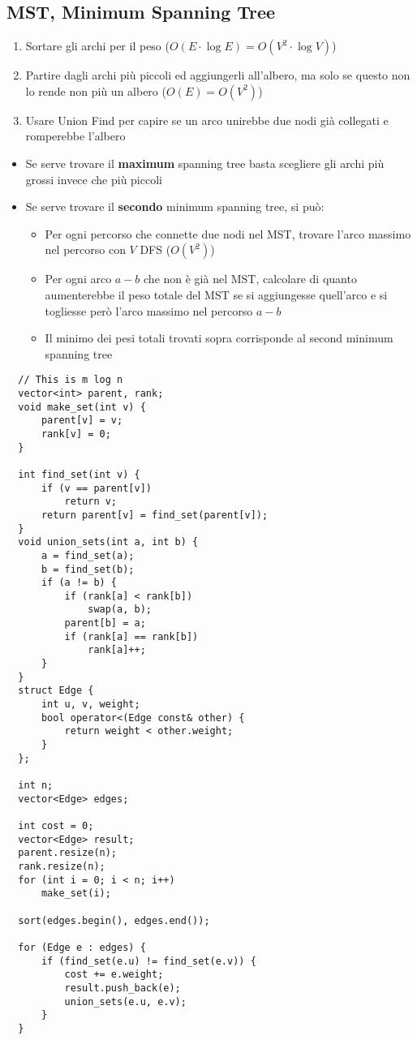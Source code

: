 \subsection{MST, Minimum Spanning Tree}
\begin{enumerate}
    \item Sortare gli archi per il peso ($O(E\cdot \log E)=O(V^2\cdot \log V)$)
    \item Partire dagli archi più piccoli ed aggiungerli all'albero, ma solo se questo non lo rende non più un albero ($O(E)=O(V^2)$)
    \item Usare Union Find per capire se un arco unirebbe due nodi già collegati e romperebbe l'albero
\end{enumerate}
\begin{itemize}
    \item Se serve trovare il \textbf{maximum} spanning tree basta scegliere gli archi più grossi invece che più piccoli
    \item Se serve trovare il \textbf{secondo} minimum spanning tree, si può:
    \begin{itemize}
        \item Per ogni percorso che connette due nodi nel MST, trovare l'arco massimo nel percorso con $V$ DFS ($O(V^2)$)
        \item Per ogni arco $a-b$ che non è già nel MST, calcolare di quanto aumenterebbe il peso totale del MST se si aggiungesse quell'arco e si togliesse però l'arco massimo nel percorso $a-b$
        \item Il minimo dei pesi totali trovati sopra corrisponde al second minimum spanning tree
    \end{itemize}
\end{itemize}

\begin{lstlisting}
  // This is m log n
  vector<int> parent, rank;
  void make_set(int v) {
      parent[v] = v;
      rank[v] = 0;
  }

  int find_set(int v) {
      if (v == parent[v])
          return v;
      return parent[v] = find_set(parent[v]);
  }
  void union_sets(int a, int b) {
      a = find_set(a);
      b = find_set(b);
      if (a != b) {
          if (rank[a] < rank[b])
              swap(a, b);
          parent[b] = a;
          if (rank[a] == rank[b])
              rank[a]++;
      }
  }
  struct Edge {
      int u, v, weight;
      bool operator<(Edge const& other) {
          return weight < other.weight;
      }
  };

  int n;
  vector<Edge> edges;

  int cost = 0;
  vector<Edge> result;
  parent.resize(n);
  rank.resize(n);
  for (int i = 0; i < n; i++)
      make_set(i);

  sort(edges.begin(), edges.end());

  for (Edge e : edges) {
      if (find_set(e.u) != find_set(e.v)) {
          cost += e.weight;
          result.push_back(e);
          union_sets(e.u, e.v);
      }
  }
\end{lstlisting}


